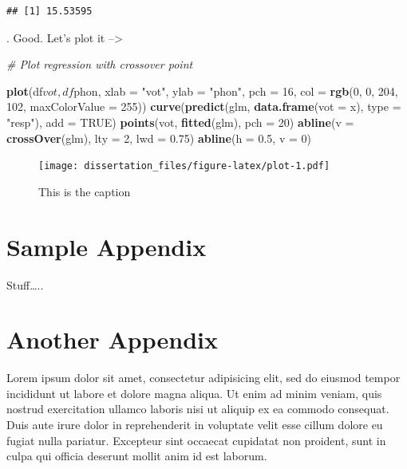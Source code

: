 \documentclass[11pt,report]{uncdissertation}
\newenvironment{Shaded}{\begin{snugshade}}{\end{snugshade}}
\newcommand{\KeywordTok}[1]{\textcolor[rgb]{0.13,0.29,0.53}{\textbf{{#1}}}}
\newcommand{\DataTypeTok}[1]{\textcolor[rgb]{0.13,0.29,0.53}{{#1}}}
\newcommand{\DecValTok}[1]{\textcolor[rgb]{0.00,0.00,0.81}{{#1}}}
\newcommand{\FloatTok}[1]{\textcolor[rgb]{0.00,0.00,0.81}{{#1}}}
\newcommand{\StringTok}[1]{\textcolor[rgb]{0.31,0.60,0.02}{{#1}}}
\newcommand{\CommentTok}[1]{\textcolor[rgb]{0.56,0.35,0.01}{\textit{{#1}}}}
\newcommand{\OtherTok}[1]{\textcolor[rgb]{0.56,0.35,0.01}{{#1}}}
\newcommand{\NormalTok}[1]{{#1}}
\begin{document}
\begin{verbatim}
## [1] 15.53595
\end{verbatim}

. Good. Let's plot it --\textgreater{}

\begin{Shaded}
\begin{Highlighting}[]
\CommentTok{# Plot regression with crossover point}

\KeywordTok{plot}\NormalTok{(df$vot, df$phon, }\DataTypeTok{xlab =} \StringTok{"vot"}\NormalTok{, }\DataTypeTok{ylab =} \StringTok{"phon"}\NormalTok{,}
     \DataTypeTok{pch =} \DecValTok{16}\NormalTok{, }\DataTypeTok{col =} \KeywordTok{rgb}\NormalTok{(}\DecValTok{0}\NormalTok{, }\DecValTok{0}\NormalTok{, }\DecValTok{204}\NormalTok{, }\DecValTok{102}\NormalTok{, }\DataTypeTok{maxColorValue =} \DecValTok{255}\NormalTok{))}
\KeywordTok{curve}\NormalTok{(}\KeywordTok{predict}\NormalTok{(glm, }\KeywordTok{data.frame}\NormalTok{(}\DataTypeTok{vot =} \NormalTok{x), }\DataTypeTok{type =} \StringTok{"resp"}\NormalTok{), }\DataTypeTok{add =} \OtherTok{TRUE}\NormalTok{)}
\KeywordTok{points}\NormalTok{(vot, }\KeywordTok{fitted}\NormalTok{(glm), }\DataTypeTok{pch =} \DecValTok{20}\NormalTok{)}
\KeywordTok{abline}\NormalTok{(}\DataTypeTok{v =} \KeywordTok{crossOver}\NormalTok{(glm), }\DataTypeTok{lty =} \DecValTok{2}\NormalTok{, }\DataTypeTok{lwd =} \FloatTok{0.75}\NormalTok{)}
\KeywordTok{abline}\NormalTok{(}\DataTypeTok{h =} \FloatTok{0.5}\NormalTok{, }\DataTypeTok{v =} \DecValTok{0}\NormalTok{)}
\end{Highlighting}
\end{Shaded}

\begin{figure}[htbp]
\centering
\texttt{[image: dissertation\_files/figure-latex/plot-1.pdf]}
\caption{This is the caption}
\end{figure}

\appendix

\chapter{Sample Appendix\label{apndxA}}

Stuff\ldots{}..

\chapter{Another Appendix\label{apndxB}}

Lorem ipsum dolor sit amet, consectetur adipisicing elit, sed do eiusmod
tempor incididunt ut labore et dolore magna aliqua. Ut enim ad minim
veniam, quis nostrud exercitation ullamco laboris nisi ut aliquip ex ea
commodo consequat. Duis aute irure dolor in reprehenderit in voluptate
velit esse cillum dolore eu fugiat nulla pariatur. Excepteur sint
occaecat cupidatat non proident, sunt in culpa qui officia deserunt
mollit anim id est laborum.
\end{document}
